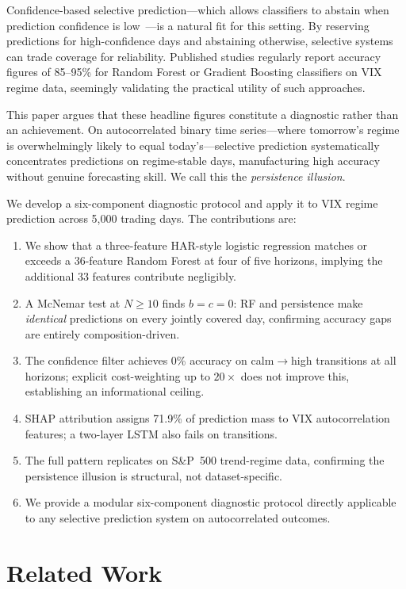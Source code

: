 \documentclass[runningheads]{llncs}
\begin{document}
Confidence-based selective prediction---which allows classifiers to abstain
when prediction confidence is low~\cite{chow1970,geifman2017}---is a natural
fit for this setting. By reserving predictions for high-confidence days and
abstaining otherwise, selective systems can trade coverage for reliability.
Published studies regularly report accuracy figures of 85--95\% for
Random Forest or Gradient Boosting classifiers on VIX regime data,
seemingly validating the practical utility of such approaches.

This paper argues that these headline figures constitute a diagnostic
rather than an achievement. On autocorrelated binary time series---where
tomorrow's regime is overwhelmingly likely to equal today's---selective
prediction systematically concentrates predictions on regime-stable days,
manufacturing high accuracy without genuine forecasting skill. We call
this the \emph{persistence illusion}.

We develop a six-component diagnostic protocol and apply it to VIX regime
prediction across 5{,}000 trading days. The contributions are:
\begin{enumerate}
\item We show that a three-feature HAR-style logistic regression
  matches or exceeds a 36-feature Random Forest at four of five horizons,
  implying the additional 33 features contribute negligibly.
\item A McNemar test at $N \geq 10$ finds $b = c = 0$: RF and persistence
  make \emph{identical} predictions on every jointly covered day,
  confirming accuracy gaps are entirely composition-driven.
\item The confidence filter achieves 0\% accuracy on calm$\to$high
  transitions at all horizons; explicit cost-weighting up to $20\times$
  does not improve this, establishing an informational ceiling.
\item SHAP attribution assigns 71.9\% of prediction mass to VIX
  autocorrelation features; a two-layer LSTM also fails on transitions.
\item The full pattern replicates on S\&P~500 trend-regime data,
  confirming the persistence illusion is structural, not dataset-specific.
\item We provide a modular six-component diagnostic protocol directly
  applicable to any selective prediction system on autocorrelated outcomes.
\end{enumerate}


\section{Related Work}
\end{document}
